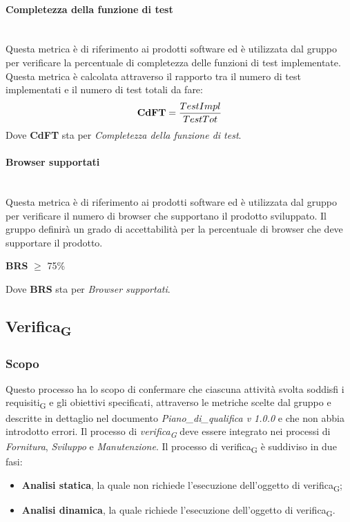 \paragraph{Completezza della funzione di test}\mbox{}\\
Questa metrica è di riferimento ai prodotti software ed è utilizzata dal gruppo per verificare la percentuale di completezza delle funzioni di test implementate. Questa metrica è calcolata attraverso il rapporto tra il numero di test implementati e il numero di test totali da fare:
\begin{align*}
	\centering
	\textbf{CdFT} = \frac{TestImpl}{TestTot}
\end{align*}
Dove \textbf{CdFT} sta per \textit{Completezza della funzione di test}.
\paragraph{Browser supportati}\mbox{}\\
Questa metrica è di riferimento ai prodotti software ed è utilizzata dal gruppo per verificare il numero di browser che supportano il prodotto sviluppato. Il gruppo definirà un grado di accettabilità per la percentuale di browser che deve supportare il prodotto.
\begin{center}
	\textbf{BRS} $\geq$ 75\%
\end{center}
Dove \textbf{BRS} sta per \textit{Browser supportati}.

\subsection{Verifica\textsubscript{G}}
\subsubsection{Scopo}
Questo processo ha lo scopo di confermare che ciascuna attività svolta soddisfi i requisiti\textsubscript{G} e gli obiettivi specificati, attraverso le metriche scelte dal gruppo e descritte in dettaglio nel documento \textit{Piano\_di\_qualifica v 1.0.0} e che non abbia introdotto errori.
Il processo di \textit{verifica\textsubscript{G}} deve essere integrato nei processi di \textit{Fornitura}, \textit{Sviluppo} e \textit{Manutenzione}.
\newline
\newline
Il processo di verifica\textsubscript{G} è suddiviso in due fasi:
\begin{itemize}
	\item \textbf{Analisi statica}, la quale non richiede l'esecuzione dell'oggetto di verifica\textsubscript{G};
	\item \textbf{Analisi dinamica}, la quale richiede l'esecuzione dell'oggetto di verifica\textsubscript{G}.
\end{itemize}

